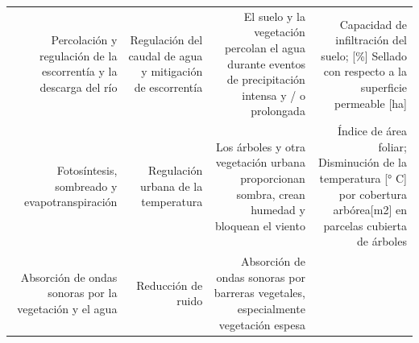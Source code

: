\documentclass[12pt,]{book}
\begin{document}
\begin{longtable}[]{@{}rrrr@{}}
\begin{minipage}[t]{0.26\columnwidth}\raggedleft\strut
Percolación y regulación de la escorrentía y la descarga del río\strut
\end{minipage} & \begin{minipage}[t]{0.22\columnwidth}\raggedleft\strut
Regulación del caudal de agua y mitigación de escorrentía\strut
\end{minipage} & \begin{minipage}[t]{0.19\columnwidth}\raggedleft\strut
El suelo y la vegetación percolan el agua durante eventos de
precipitación intensa y / o prolongada\strut
\end{minipage} & \begin{minipage}[t]{0.22\columnwidth}\raggedleft\strut
Capacidad de infiltración del suelo; {[}\%{]} Sellado con respecto a la
superficie permeable {[}ha{]}\strut
\end{minipage}\tabularnewline
\begin{minipage}[t]{0.26\columnwidth}\raggedleft\strut
Fotosíntesis, sombreado y evapotranspiración\strut
\end{minipage} & \begin{minipage}[t]{0.22\columnwidth}\raggedleft\strut
Regulación urbana de la temperatura\strut
\end{minipage} & \begin{minipage}[t]{0.19\columnwidth}\raggedleft\strut
Los árboles y otra vegetación urbana proporcionan sombra, crean humedad
y bloquean el viento\strut
\end{minipage} & \begin{minipage}[t]{0.22\columnwidth}\raggedleft\strut
Índice de área foliar; Disminución de la temperatura {[}° C{]} por
cobertura arbórea{[}m2{]} en parcelas cubierta de árboles\strut
\end{minipage}\tabularnewline
\begin{minipage}[t]{0.26\columnwidth}\raggedleft\strut
Absorción de ondas sonoras por la vegetación y el agua\strut
\end{minipage} & \begin{minipage}[t]{0.22\columnwidth}\raggedleft\strut
Reducción de ruido\strut
\end{minipage} & \begin{minipage}[t]{0.19\columnwidth}\raggedleft\strut
Absorción de ondas sonoras por barreras vegetales, especialmente
vegetación espesa\strut
\end{minipage} & \begin{minipage}[t]{0.22\columnwidth}\raggedleft\strut

\end{minipage}
\end{longtable}
\end{document}
